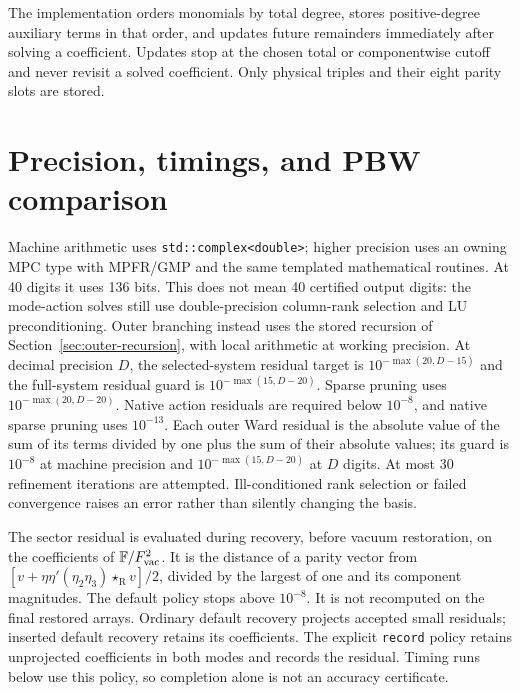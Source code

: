 \documentclass[11pt]{article}
\newcommand{\R}{\mathrm{R}}
\newcommand{\FF}{\mathbb F}
\newcommand{\st}{\star_{\R}}
\numberwithin{equation}{section}
\begin{document}
The implementation orders monomials by total degree, stores positive-degree
auxiliary terms in that order, and updates future remainders immediately after
solving a coefficient. Updates stop at the chosen total or componentwise
cutoff and never revisit a solved
coefficient. Only physical triples and their eight parity slots are stored.

\section{Precision, timings, and PBW comparison}
\label{sec:timings}

Machine arithmetic uses \texttt{std::complex<double>}; higher precision uses
an owning MPC type with MPFR/GMP and the same templated mathematical routines.
At 40 digits it uses 136 bits. This does not mean 40 certified output digits:
the mode-action solves still use double-precision column-rank selection and
LU preconditioning. Outer branching instead uses the stored recursion of
Section~\ref{sec:outer-recursion}, with local arithmetic at working precision.
At decimal precision $D$, the selected-system residual target is
$10^{-\max(20,D-15)}$ and the full-system residual guard is
$10^{-\max(15,D-20)}$. Sparse pruning uses $10^{-\max(20,D-20)}$.
Native action residuals are required below $10^{-8}$, and native sparse
pruning uses $10^{-13}$. Each outer Ward residual is the absolute value of the sum of its
terms divided by one plus the sum of their absolute values; its guard is
$10^{-8}$ at machine precision and $10^{-\max(15,D-20)}$ at $D$ digits.
At most 30 refinement iterations are attempted. Ill-conditioned rank selection
or failed convergence raises an error rather than silently changing the basis.

The sector residual is evaluated during recovery, before vacuum restoration,
on the coefficients of $\FF/F_{\rm vac}^2$. It is the distance of a parity vector from
$[v+\eta\eta'(\eta_2\eta_3)\st v]/2$, divided by the largest of one and
its component magnitudes. The default policy stops above $10^{-8}$.
It is not recomputed on the final restored arrays.
Ordinary default recovery projects accepted small residuals; inserted default
recovery retains its coefficients. The explicit \texttt{record} policy retains
unprojected coefficients in both modes and records the residual. Timing runs
below use this policy, so completion alone is not an accuracy certificate.
\end{document}
